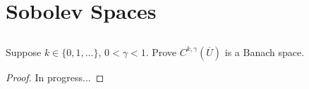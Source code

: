 \documentclass[11pt]{article}
\begin{document}
\pagestyle{fancy}
\fancyhead{}
\tableofcontents
\newpage
\setcounter{section}{4}
\section{Sobolev Spaces}
\subsection{}
Suppose $k \in \{0,1,\dots\}$, $0 < \gamma < 1$. Prove $C^{k,\gamma}(\overline{U})$ is a Banach space.
\begin{proof}
In progress...
\end{proof}
\setcounter{subsection}{2}
\subsection{}
\end{document}
